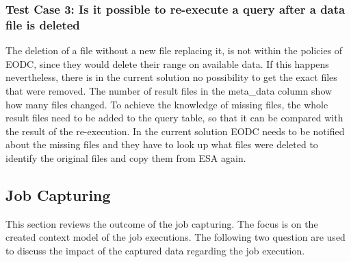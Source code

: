 \documentclass[draft,final]{vutinfth} %
\begin{document}
\subsubsection{Test Case 3: Is it possible to re-execute a query after a data file is deleted}
The deletion of a file without a new file replacing it, is not within the policies of EODC, since they would delete their range on available data. If this happens nevertheless, there is in the current solution no possibility to get the exact files that were removed. The number of result files in the meta\_data column show how many files changed. To achieve the knowledge of missing files, the whole result files need to be added to the query table, so that it can be compared with the result of the re-execution. In the current solution EODC needs to be notified about the missing files and they have to look up what files were deleted to identify the original files and copy them from ESA again. 


\subsection{Job Capturing}\label{Evaluation:special_jobcap}

This section reviews the outcome of the job capturing. The focus is on the created context model of the job executions. The following two question are used to discuss the impact of the captured data regarding the job execution.  \\
\end{document}
